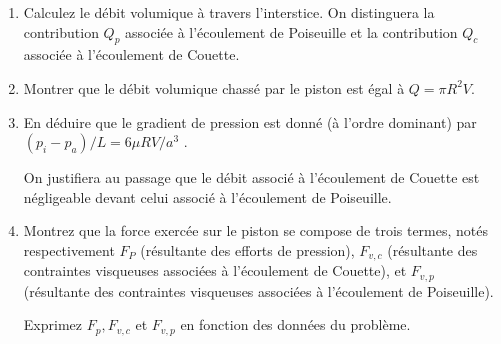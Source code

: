 \begin{enumerate}


\item Calculez le débit volumique à travers l'interstice. On distinguera la contribution $Q_p$  associée à l'écoulement de Poiseuille et la contribution $Q_c$ associée à l'écoulement de Couette.



\item Montrer que le débit volumique chassé par le piston est égal à $Q = \pi R^2 V$.



\item En déduire que le gradient de pression est donné (à l'ordre dominant) par 
$(p_i-p_a)/L = 6 \mu R V/a^3$ .

On justifiera au passage que le débit associé à l'écoulement de Couette est négligeable devant celui associé à l'écoulement de Poiseuille.






\item  Montrez que la force exercée sur le piston se compose de trois termes, notés respectivement $F_P$ (résultante des efforts de pression), $F_{v,c}$ (résultante des contraintes visqueuses associées à l'écoulement de Couette), et $F_{v,p}$ (résultante des contraintes visqueuses associées à l'écoulement de Poiseuille).

Exprimez $F_p, F_{v,c}$ et $F_{v,p}$ en fonction des données du problème.


\end{enumerate}
